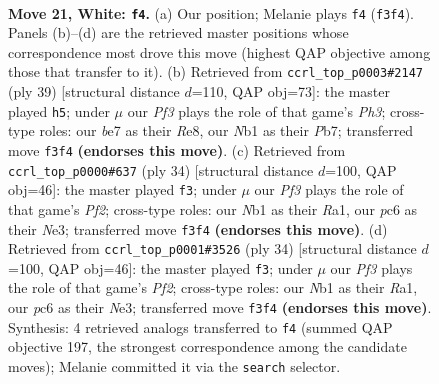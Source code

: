 \documentclass[11pt]{article}
\begin{document}
\clearpage

\begin{figure}[p]\centering
\begin{subfigure}{0.46\textwidth}\centering
\resizebox{\linewidth}{!}{%
\newchessgame
\chessboard[
  setfen={r1b1r1k1/p2nb2p/2p2pp1/3q4/Pp1p3P/1P1Q1PP1/3NPK2/RNB2R2 w - - 0 21},
  showmover=false,
  pgfstyle=straightmove, color=movearrow, markmove={f3-f4}
]}
\caption{}
\end{subfigure}\hfill
\begin{subfigure}{0.46\textwidth}\centering
\resizebox{\linewidth}{!}{%
\newchessgame
\chessboard[
  setfen={2r1r1k1/1p3pb1/p2q1npp/P2Pn3/2p1P3/2N5/1P1QBBPP/R4R1K b - - 4 20},
  showmover=false,
  pgfstyle=straightmove, color=movearrow, markmove={h6-h5}
]}
\caption{}
\end{subfigure}
\\[4pt]
\begin{subfigure}{0.46\textwidth}\centering
\resizebox{\linewidth}{!}{%
\newchessgame
\chessboard[
  setfen={r3kb1r/pb1n1p2/2q1p2p/1p4p1/3P4/3QN2N/PPP2PPP/R1B2RK1 w kq - 6 18},
  showmover=false,
  pgfstyle=straightmove, color=movearrow, markmove={f2-f3}
]}
\caption{}
\end{subfigure}\hfill
\begin{subfigure}{0.46\textwidth}\centering
\resizebox{\linewidth}{!}{%
\newchessgame
\chessboard[
  setfen={r3kb1r/pb1n1p2/2q1p2p/1p4p1/3P4/3QN2N/PPP2PPP/R1B2RK1 w kq - 6 18},
  showmover=false,
  pgfstyle=straightmove, color=movearrow, markmove={f2-f3}
]}
\caption{}
\end{subfigure}
\caption{\textbf{Move 21, White: \texttt{f4}.} (a) Our position; Melanie plays \texttt{f4} (\texttt{f3f4}). Panels (b)--(d) are the retrieved master positions whose correspondence most drove this move (highest QAP objective among those that transfer to it). (b) Retrieved from \texttt{ccrl\_top\_p0003\#2147} (ply 39) [structural distance $d$=110, QAP obj=73]: the master played \texttt{h5}; under $\mu$ our \emph{Pf3} plays the role of that game's \emph{Ph3}; cross-type roles: our \emph{b}e7 as their \emph{R}e8, our \emph{N}b1 as their \emph{P}b7; transferred move \texttt{f3f4} \textbf{(endorses this move)}. (c) Retrieved from \texttt{ccrl\_top\_p0000\#637} (ply 34) [structural distance $d$=100, QAP obj=46]: the master played \texttt{f3}; under $\mu$ our \emph{Pf3} plays the role of that game's \emph{Pf2}; cross-type roles: our \emph{N}b1 as their \emph{R}a1, our \emph{p}c6 as their \emph{N}e3; transferred move \texttt{f3f4} \textbf{(endorses this move)}. (d) Retrieved from \texttt{ccrl\_top\_p0001\#3526} (ply 34) [structural distance $d$=100, QAP obj=46]: the master played \texttt{f3}; under $\mu$ our \emph{Pf3} plays the role of that game's \emph{Pf2}; cross-type roles: our \emph{N}b1 as their \emph{R}a1, our \emph{p}c6 as their \emph{N}e3; transferred move \texttt{f3f4} \textbf{(endorses this move)}. Synthesis: 4 retrieved analogs transferred to \texttt{f4} (summed QAP objective 197, the strongest correspondence among the candidate moves); Melanie committed it via the \texttt{search} selector.}
\label{fig:thought-m40}
\end{figure}
\end{document}
